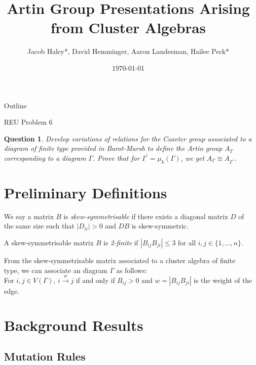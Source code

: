 \documentclass{beamer}
\title[Artin Group Presentations]{Artin Group Presentations Arising from Cluster Algebras}
\author{Jacob Haley*, David Hemminger, Aaron Landesman, 
Hailee Peck*}
\institute{University of Minnesota, Twin Cities REU}
\date{\today}
\newtheorem{question}{Question}
\begin{document}
\begin{frame}
  \titlepage
\end{frame}

 
\begin{frame}{Outline}
  \tableofcontents
\end{frame}

\begin{frame}{REU Problem 6}
\begin{question}
Develop variations of relations for the Coxeter group associated to a diagram of finite type provided in Barot-Marsh to define the Artin group $A_{\Gamma}$ corresponding to a diagram $\Gamma$. Prove that for $\Gamma^{\prime} = \mu_k(\Gamma)$, we get $A_{\Gamma} \cong A_{\Gamma^{\prime}}$. 
\end{question}
\end{frame}

\section{Preliminary Definitions}

\begin{frame}
\begin{definition}
We say a matrix $B$ is \textit{skew-symmetrisable} if there exists a diagonal matrix $D$ of the same size such that $|D_{ii}|>0$ and $DB$ is skew-symmetric.
\end{definition}

\pause

\begin{definition}
A skew-symmetrisable matrix $B$ is \textit{2-finite} if $|B_{ij}B_{ji}| \leq 3$ for all $i, j \in \{ 1, \ldots, n \}$.
\end{definition}

\pause

From the skew-symmetrisable matrix associated to a cluster algebra of finite type, we can associate an diagram $\Gamma$ as follows:\\


For $i, j \in V(\Gamma)$, $i \xrightarrow{w} j$ if and only if $B_{ij}>0$ and $w = |B_{ij}B_{ji}|$ is the weight of the edge.

\end{frame}


\section{Background Results}

\subsection{Mutation Rules}
\end{document}
